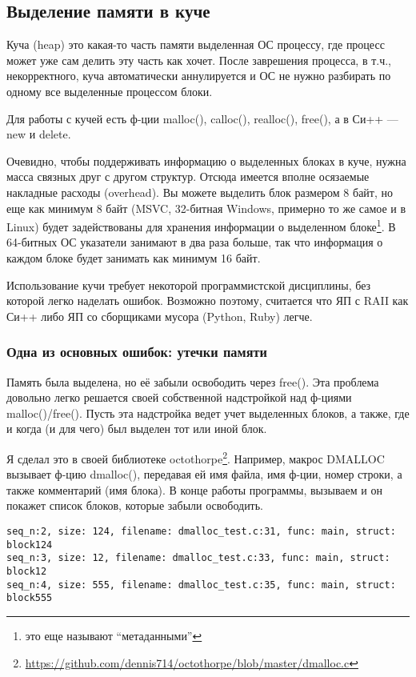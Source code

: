 ﻿\subsection{Выделение памяти в куче}

Куча (heap) это какая-то часть памяти выделенная ОС процессу, где процесс может уже сам делить эту часть как хочет.
После заврешения процесса, в т.ч., некорректного, куча автоматически аннулируется и ОС не нужно разбирать 
по одному все выделенные процессом блоки.

Для работы с кучей есть ф-ции malloc(), calloc(), realloc(), free(), а в Си++ --- new и delete.

Очевидно, чтобы поддерживать информацию о выделенных блоках в куче, нужна масса связных друг с другом структур.
Отсюда имеется вполне осязаемые накладные расходы (overhead). Вы можете выделить блок размером 8 байт, 
но еще как минимум 8 байт (MSVC, 32-битная Windows, примерно то же самое и в Linux)
будет задействованы для хранения информации о выделенном блоке\footnote{это еще называют ``метаданными''}.
В 64-битных ОС указатели занимают в два раза больше, так что информация о каждом блоке будет занимать как минимум
16 байт.

Использование кучи требует некоторой программистской дисциплины, без которой легко наделать ошибок.
Возможно поэтому, считается что ЯП с RAII как Си++
либо ЯП со сборщиками мусора (Python, Ruby) легче.

\subsubsection{Одна из основных ошибок: утечки памяти}

Память была выделена, но её забыли освободить через free(). Эта проблема довольно легко решается своей собственной
надстройкой над ф-циями malloc()/free(). Пусть эта надстройка ведет учет выделенных блоков, а также, где и когда
(и для чего) был выделен тот или иной блок.

Я сделал это в своей библиотеке octothorpe\footnote{\url{https://github.com/dennis714/octothorpe/blob/master/dmalloc.c}}. 
Например, макрос DMALLOC вызывает ф-цию dmalloc(), передавая
ей имя файла, имя ф-ции, номер строки, а также комментарий (имя блока). В конце работы программы, вызываем
 и он покажет список блоков, которые забыли освободить.

\begin{lstlisting}
seq_n:2, size: 124, filename: dmalloc_test.c:31, func: main, struct: block124
seq_n:3, size: 12, filename: dmalloc_test.c:33, func: main, struct: block12
seq_n:4, size: 555, filename: dmalloc_test.c:35, func: main, struct: block555
\end{lstlisting}

